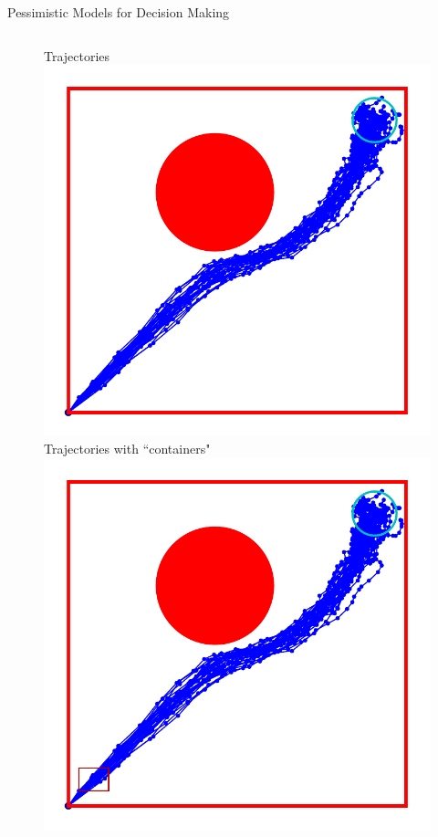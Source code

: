 \documentclass[lecture]{beamer}
\begin{document}
\begin{frame}{\normalsize Pessimistic Models for Decision Making}
\begin{columns}[t]
\begin{overlayarea}{\textwidth}{0.6\textheight}
\begin{figure}
{	}
        {%
        \center
        Trajectories 
   \includegraphics[width=\FS\textwidth]{Codes/BasicsSafety/PessimisticModel0.pdf}%
        }%
        {%
        \center
        Trajectories with ``containers"
  \includegraphics[width=\FS\textwidth]{Codes/BasicsSafety/PessimisticModel1.pdf}%
}
\end{figure}
\end{overlayarea}
\end{columns}
\end{frame}
\end{document}

